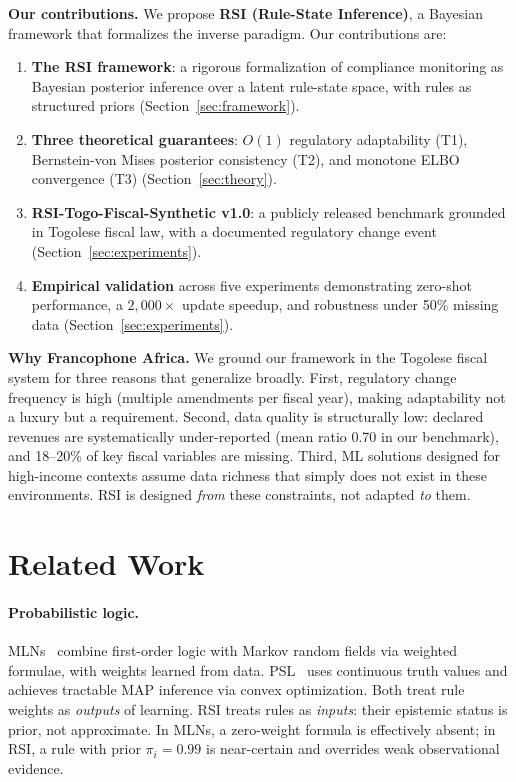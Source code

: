 \documentclass[letterpaper]{article}
\begin{document}
\medskip
\noindent\textbf{Our contributions.}
We propose \textbf{RSI (Rule-State Inference)}, a Bayesian framework
that formalizes the inverse paradigm. Our contributions are:
\begin{enumerate}[leftmargin=2em, label=(\arabic*)]
  \item \textbf{The RSI framework}: a rigorous formalization of
        compliance monitoring as Bayesian posterior inference over a
        latent rule-state space, with rules as structured priors
        (Section~\ref{sec:framework}).
  \item \textbf{Three theoretical guarantees}: $O(1)$ regulatory
        adaptability (T1), Bernstein-von Mises posterior consistency
        (T2), and monotone ELBO convergence (T3)
        (Section~\ref{sec:theory}).
  \item \textbf{RSI-Togo-Fiscal-Synthetic v1.0}: a publicly released
        benchmark grounded in Togolese fiscal law, with a documented
        regulatory change event (Section~\ref{sec:experiments}).
  \item \textbf{Empirical validation} across five experiments
        demonstrating zero-shot performance, a $2{,}000\times$ update
        speedup, and robustness under 50\% missing data
        (Section~\ref{sec:experiments}).
\end{enumerate}

\medskip
\noindent\textbf{Why Francophone Africa.}
We ground our framework in the Togolese fiscal system for three reasons
that generalize broadly. First, regulatory change frequency is high
(multiple amendments per fiscal year), making adaptability not a luxury
but a requirement. Second, data quality is structurally low: declared
revenues are systematically under-reported (mean ratio 0.70 in our
benchmark), and 18--20\% of key fiscal variables are missing. Third,
ML solutions designed for high-income contexts assume data richness
that simply does not exist in these environments. RSI is designed
\emph{from} these constraints, not adapted \emph{to} them.

\section{Related Work}
\label{sec:related}

\paragraph{Probabilistic logic.}
MLNs~\citep{richardson2006markov} combine first-order logic with Markov
random fields via weighted formulae, with weights learned from data.
PSL~\citep{bach2017hinge} uses continuous truth values and achieves
tractable MAP inference via convex optimization. Both treat rule weights
as \emph{outputs} of learning. RSI treats rules as \emph{inputs}: their
epistemic status is prior, not approximate. In MLNs, a zero-weight
formula is effectively absent; in RSI, a rule with prior $\pi_i = 0.99$
is near-certain and overrides weak observational evidence.
\end{document}

